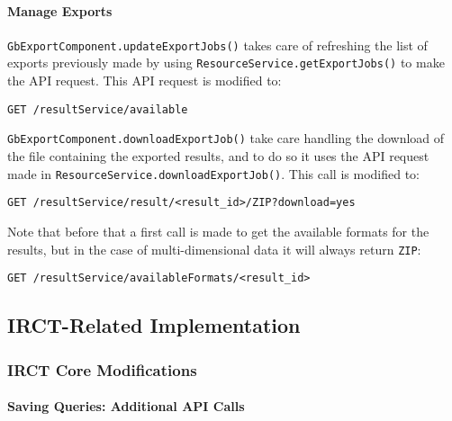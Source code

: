 \paragraph{Manage Exports}

\verb|GbExportComponent.updateExportJobs()| takes care of refreshing the list of exports previously made by using \verb|ResourceService.getExportJobs()| to make the API request.
This API request is modified to:
\begin{verbatim}
GET /resultService/available
\end{verbatim}

\verb|GbExportComponent.downloadExportJob()| take care handling the download of the file containing the exported results, and to do so it uses the API request made in \verb|ResourceService.downloadExportJob()|.
This call is modified to:
\begin{verbatim}
GET /resultService/result/<result_id>/ZIP?download=yes
\end{verbatim}

Note that before that a first call is made to get the available formats for the results, but in the case of multi-dimensional data it will always return \verb|ZIP|:
\begin{verbatim}
GET /resultService/availableFormats/<result_id>
\end{verbatim}



\subsection{IRCT-Related Implementation}

\subsubsection{IRCT Core Modifications}

\paragraph{Saving Queries: Additional API Calls}
\label{sec:irctsavedqueries}

